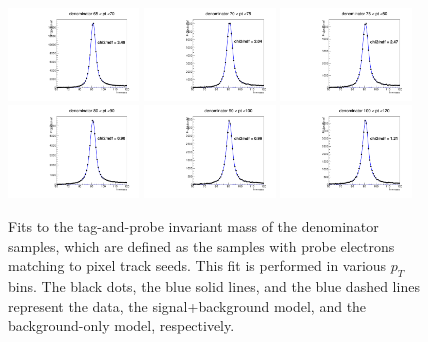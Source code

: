 \documentclass[thesis.tex]{subfiles}
\renewcommand\_{\textunderscore\allowbreak}
\begin{document}
\begin{figure}[hbtp]
   \includegraphics[width=0.31\textwidth]{Figures/Bw_ker_pt_den_65_70.pdf}  \includegraphics[width=0.31\textwidth]{Figures/Bw_ker_pt_den_70_75.pdf}  \includegraphics[width=0.31\textwidth]{Figures/Bw_ker_pt_den_75_80.pdf} \\
 \includegraphics[width=0.31\textwidth]{Figures/Bw_ker_pt_den_80_90.pdf} \includegraphics[width=0.31\textwidth]{Figures/Bw_ker_pt_den_90_100.pdf}   \includegraphics[width=0.31\textwidth]{Figures/Bw_ker_pt_den_100_120.pdf}\\
  \caption{Fits to the tag-and-probe invariant mass of the denominator samples, which are defined as the samples with probe electrons matching to pixel track seeds. This fit is performed in various $p_T$ bins. The black dots, the blue solid lines, and the blue dashed lines
represent the data, the signal+background model, and the background-only model, respectively.} 
 \label{fig:fitAllele}
\end{figure}
\end{document}
